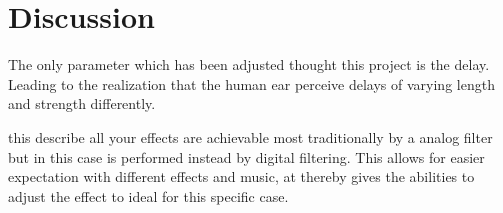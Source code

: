 \clearpage
\section{Discussion}
The only parameter which has been adjusted thought this project is the delay. Leading to the realization that the human ear perceive delays of varying length and strength differently. 

this describe all your effects are achievable most traditionally by a analog filter but in this case is performed instead by digital filtering.
This allows for easier expectation with different effects and music, at thereby gives the abilities to adjust the effect to ideal for this specific case.


